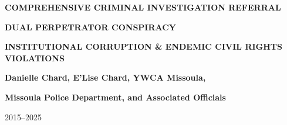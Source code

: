 \documentclass[12pt,oneside]{article}
\begin{document}
\begin{center}

\vspace*{0.5in}

{\textbf{\Large COMPREHENSIVE CRIMINAL INVESTIGATION REFERRAL}}

\vspace{0.2in}


{\textbf{DUAL PERPETRATOR CONSPIRACY}}

\vspace{0.1in}


{\textbf{INSTITUTIONAL CORRUPTION \& ENDEMIC CIVIL RIGHTS VIOLATIONS}}

\vspace{0.1in}


{\textbf{Danielle Chard, E'Lise Chard, YWCA Missoula,}}

\vspace{0.05in}


{\textbf{Missoula Police Department, and Associated Officials}}

\vspace{0.1in}


2015--2025

\vspace{0.5in}

\end{center}
\end{document}
